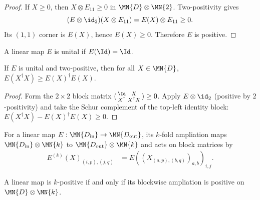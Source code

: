 \begin{proof}
    \leanok
    If $X\geq0$, then $X\otimes E_{11}\geq0$ in
    $\MN{D}\otimes\MN{2}$. Two-positivity gives
    \[
        (E\otimes\id_2)(X\otimes E_{11})=E(X)\otimes E_{11}\geq0.
    \]
    Its $(1,1)$ corner is $E(X)$, hence $E(X)\geq0$. Therefore $E$ is
    positive.
\end{proof}

\begin{definition}\label{def:unital_linear_map}
    \leanok
    A linear map $E$ is unital if $E(\Id)=\Id$.
\end{definition}

\begin{theorem}\label{thm:kadison_schwarz_2positive}
    \leanok
    If $E$ is unital and two-positive, then for all $X\in\MN{D}$,
    $E(X^\dagger X)\ge E(X)^\dagger E(X)$.
\end{theorem}

\begin{proof}
    \leanok
    Form the $2\times 2$ block matrix
    $(\begin{smallmatrix} \Id & X \\ X^\dagger & X^\dagger X \end{smallmatrix})\ge0$.
    Apply $E\otimes\id_{2}$ (positive by $2$-positivity) and take the Schur
    complement of the top-left identity block:
    $E(X^\dagger X)-E(X)^\dagger E(X)\ge0$.
\end{proof}

\begin{definition}\label{def:blockwise_ampliation}
    \leanok
    For a linear map $E : \MN{D_{\rm in}}\to\MN{D_{\rm out}}$, its $k$-fold
    ampliation maps $\MN{D_{\rm in}}\otimes\MN{k}$ to
    $\MN{D_{\rm out}}\otimes\MN{k}$ and acts on
    block matrices by
    \begin{align}
        E^{(k)}(X)_{(i,p),(j,q)}
         & =E((X_{(a,p),(b,q)})_{a,b})_{i,j}.
        \label{eq:schwarz_blockwise_ampliation}
    \end{align}
\end{definition}

\begin{theorem}
    \leanok
    A linear map is $k$-positive if and only if its blockwise ampliation is
    positive on $\MN{D}\otimes\MN{k}$.
\end{theorem}

